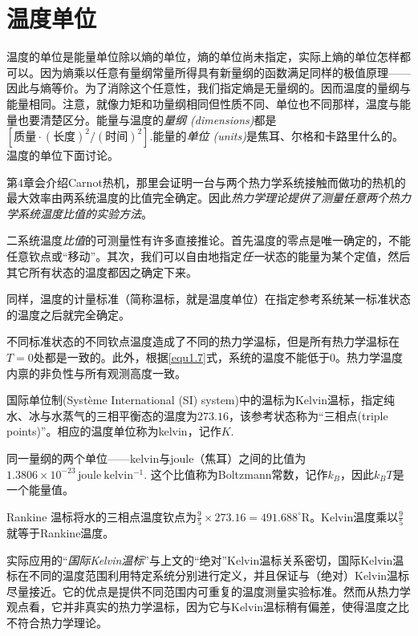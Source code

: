 \section{温度单位}
\label{sec2.6}
温度的单位是能量单位除以熵的单位，熵的单位尚未指定，实际上熵的单位怎样都可以。因为熵乘以任意有量纲常量所得具有新量纲的函数满足同样的极值原理——因此与熵等价。为了消除这个任意性，我们指定熵是无量纲的。因而温度的量纲与能量相同。注意，就像力矩和功量纲相同但性质不同、单位也不同那样，温度与能量也要清楚区分。能量与温度的{\it 量纲 (dimensions)}都是$[\text{质量} \cdot (\text{长度})^2 / (\text{时间})^2].$能量的{\it 单位 (units)}是焦耳、尔格和卡路里什么的。温度的单位下面讨论。

第4章会介绍Carnot热机，那里会证明一台与两个热力学系统接触而做功的热机的最大效率由两系统温度的比值完全确定。因此{\it 热力学理论提供了测量任意两个热力学系统温度比值的实验方法}。

二系统温度{\it 比值}的可测量性有许多直接推论。首先温度的零点是唯一确定的，不能任意钦点或“移动”。其次，我们可以自由地指定{\it 任一}状态的能量为某个定值，然后其它所有状态的温度都因之确定下来。

同样，温度的计量标准（简称温标，就是温度单位）在指定参考系统某一标准状态的温度之后就完全确定。

不同标准状态的不同钦点温度造成了不同的热力学温标，但是所有热力学温标在$T = 0$处都是一致的。此外，根据\eqref{equ1.7}式，系统的温度不能低于$0$。热力学温度内禀的非负性与所有观测高度一致。

国际单位制(Système International (SI) system)中的温标为Kelvin温标，指定纯水、冰与水蒸气的三相平衡态的温度为$273.16$，该参考状态称为“三相点(triple points)”。相应的温度单位称为kelvin，记作$\si{K}$.

同一量纲的两个单位——kelvin与joule（焦耳）之间的比值为$1.3806 \times 10^{-23} \,\mathrm{joule\ kelvin^{-1}}$. 这个比值称为Boltzmann常数，记作$k_B$，因此$k_B T$是一个能量值。

Rankine 温标将水的三相点温度钦点为$\frac{9}{5} \times 273.16 = 491.688^\circ \mathrm{R}$。Kelvin温度乘以$\frac{9}{5}$就等于Rankine温度。

实际应用的“{\it 国际Kelvin温标}”与上文的“绝对”Kelvin温标关系密切，国际Kelvin温标在不同的温度范围利用特定系统分别进行定义，并且保证与（绝对）Kelvin温标尽量接近。它的优点是提供不同范围内可重复的温度测量实验标准。然而从热力学观点看，它并非真实的热力学温标，因为它与Kelvin温标稍有偏差，使得温度之比不符合热力学理论。

